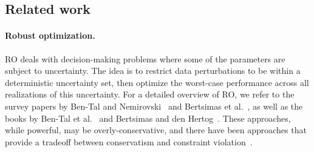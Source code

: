 \documentclass[12pt]{article}
\newcommand{\citep}{\cite}
\theoremstyle{thmstyleone}%
\theoremstyle{thmstyletwo}%
\theoremstyle{thmstylethree}%
\begin{document}
\subsection{Related work}%
\label{sub:related_work}
\paragraph{Robust optimization.}
\gls{RO} deals with decision-making problems where some of the parameters are subject to uncertainty.
The idea is to restrict data perturbations to be within a deterministic uncertainty set, then optimize the worst-case performance across all realizations of this uncertainty.
For a detailed overview of \gls{RO}, we refer to the survey papers by Ben-Tal and Nemirovski~\cite{robustconvexopt} and Bertsimas et al.~\cite{bertsimassurvey}, as well as the books by Ben-Tal et al.~\cite{ben-tal_robust_2009} and Bertsimas and den Hertog~\cite{robustadaptopt}.
These approaches, while powerful, may be overly-conservative, and there have been approaches that provide a tradeoff between conservatism and constraint violation~\citep{reduce_conserve}.
\end{document}
